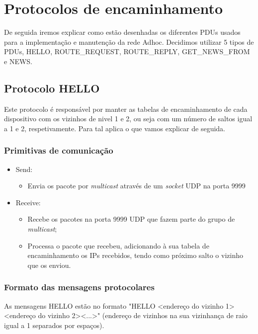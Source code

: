 \documentclass{llncs}
\begin{document}
%
\section{Protocolos de encaminhamento}
%
De seguida iremos explicar como estão desenhadas os diferentes PDUs usados para a implementação e manutenção da rede Adhoc. Decidimos utilizar 5 tipos de PDUs, HELLO, ROUTE\_REQUEST, ROUTE\_REPLY, GET\_NEWS\_FROM e NEWS.

%
\subsection{Protocolo HELLO}
%
Este protocolo é responsável por manter as tabelas de encaminhamento de cada dispositivo com os vizinhos de nivel 1 e 2, ou seja com um número de saltos igual a 1 e 2, respetivamente. Para tal aplica o que vamos explicar de seguida.

\subsubsection{Primitivas de comunicação}

\begin{itemize}
    \item Send: \begin{itemize}
        \item Envia os pacote por \emph{multicast} através de um \emph{socket} UDP na porta 9999
    \end{itemize}
    \item Receive: \begin{itemize}
        \item Recebe os pacotes na porta 9999 UDP que fazem parte do grupo de \emph{multicast};
        \item Processa o pacote que recebeu, adicionando à sua tabela de encaminhamento os IPs recebidos, tendo como próximo salto o vizinho que os enviou.
    \end{itemize}
\end{itemize}

\subsubsection{Formato das mensagens protocolares}

As mensagens HELLO estão no formato "HELLO \textless endereço do vizinho 1\textgreater \textless endereço do vizinho 2\textgreater \textless...\textgreater" (endereço de vizinhos na sua vizinhança de raio igual a 1 separados por espaços).
\end{document}
